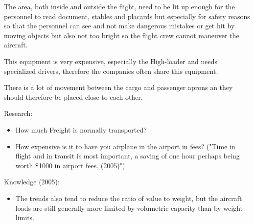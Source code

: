 The area, both inside and outside the flight, need to be lit up enough for the personnel to read document, stables and placards but especially for safety reasons so that the personnel can see and not make dangerous mistakes or get hit by moving objects but also not too bright so the flight crew cannot maneuver the aircraft.

This equipment is very expensive, especially the High-loader and needs specialized drivers, therefore the companies often share this equipment.

There is a lot of movement between the cargo and passenger aprons an they should therefore be placed close to each other.

Research:
\begin{itemize}
\item How much Freight is normally transported?
\item How expensive is it to have you airplane in the airport in fees? ("Time in flight and in transit is most important, a saving of one hour perhaps being worth \$1000 in airport fees. (2005)")
\end{itemize}


Knowledge (2005):
\begin{itemize}
\item The trends also tend to reduce the ratio of value to weight, but the aircraft loads are still generally more limited by volumetric capacity than by weight limits.
\end{itemize}